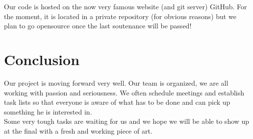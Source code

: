 \documentclass[12pt]{report}
\begin{document}
\begin{center}
\end{center}

Our code is hosted on the now very famous website (and git server) GitHub. For
the moment, it is located in a private repository (for obvious reasons) but we
plan to go opensource once the last soutenance will be passed!

\chapter*{Conclusion}

Our project is moving forward very well. Our team is organized, we are all
working with passion and seriousness. We often schedule meetings and establish
task lists so that everyone is aware of what has to be done and can pick up
something he is interested in. \\

Some very tough tasks are waiting for us and we hope we will be able to show up
at the final with a fresh and working piece of art.
\end{document}
